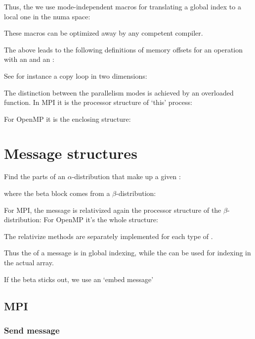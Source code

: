 \documentclass[11pt,fleqn,preprint]{impreport}
\begin{document}
Thus, the we use mode-independent macros for translating a global
index to a local one in the numa space:
%

These macros can be optimized away by any competent compiler.

The above leads to the following definitions of memory offsets for an
operation with an  and an :


See for instance a
copy loop in two dimensions:


The distinction between the parallelism modes is achieved by an
overloaded function. In MPI it is the processor structure of `this' process:


For OpenMP it is the enclosing structure:


\section{Message structures}

Find the parts of an $\alpha$-distribution that make up a given :
%

where
the beta block comes from a $\beta$-distribution:
%

For MPI, the message is relativized again the processor structure of
the $\beta$-distribution:
%
%
For OpenMP it's the whole structure:
%

The relativize methods are separately implemented for each type of .
%

Thus the  of a message is in global indexing, while
the  can be used for indexing in the actual array.

If the beta sticks out, we use an `embed message'
%

\subsection{MPI}

\subsubsection{Send message}
\end{document}
